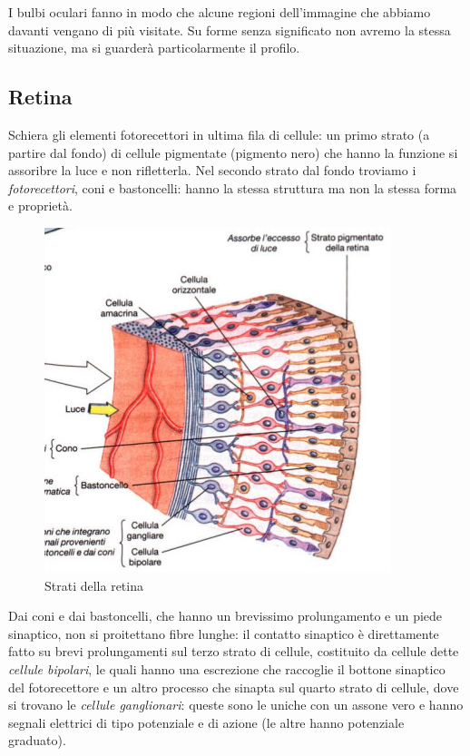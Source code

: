 \documentclass[a4paper,12pt]{article}
\begin{document}
I bulbi oculari fanno in modo che alcune regioni dell'immagine che abbiamo davanti vengano di più visitate. Su forme senza significato non avremo la stessa situazione, ma si guarderà particolarmente il profilo. 

\subsection{Retina}
Schiera gli elementi fotorecettori in ultima fila di cellule: un primo strato (a partire dal fondo) di cellule pigmentate (pigmento nero) che hanno la funzione si assoribre la luce e non rifletterla. Nel secondo strato dal fondo troviamo i \emph{fotorecettori}, coni e bastoncelli: hanno la stessa struttura ma non la stessa forma e proprietà. 

\begin{figure}[H]
\centering
\includegraphics[scale=0.45]{immagine/retina.jpg}
\caption{Strati della retina}
\end{figure} 

Dai coni e dai bastoncelli, che hanno un brevissimo prolungamento e un piede sinaptico, non si proitettano fibre lunghe: il contatto sinaptico è direttamente fatto su brevi prolungamenti sul terzo strato di cellule, costituito da cellule dette \emph{cellule bipolari}, le quali hanno una escrezione che raccoglie il bottone sinaptico del fotorecettore e un altro processo che sinapta sul quarto strato di cellule, dove si trovano le \emph{cellule ganglionari}: queste sono le uniche con un assone vero e hanno segnali elettrici di tipo potenziale e di azione (le altre hanno potenziale graduato).
\end{document}
